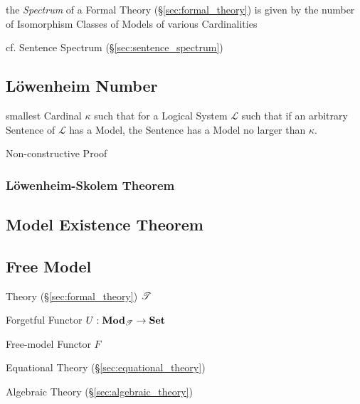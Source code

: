 the \emph{Spectrum} of a Formal Theory (\S\ref{sec:formal_theory}) is given by
the number of Isomorphism Classes of Models of various Cardinalities

cf. Sentence Spectrum (\S\ref{sec:sentence_spectrum})



\subsection{L\"owenheim Number}\label{sec:lowenheim_number}

smallest Cardinal $\kappa$ such that for a Logical System
$\mathcal{L}$ such that if an arbitrary Sentence of $\mathcal{L}$ has
a Model, the Sentence has a Model no larger than $\kappa$.

Non-constructive Proof



\subsubsection{L\"owenheim-Skolem Theorem}\label{sec:lowenheim_skolem}



\subsection{Model Existence Theorem}\label{sec:model_existence}

\subsection{Free Model}\label{sec:free_model}

Theory (\S\ref{sec:formal_theory}) $\mathscr{T}$

Forgetful Functor $U : \mathbf{Mod}_\mathscr{T} \rightarrow \mathbf{Set}$

Free-model Functor $F$

Equational Theory (\S\ref{sec:equational_theory})

Algebraic Theory (\S\ref{sec:algebraic_theory})

